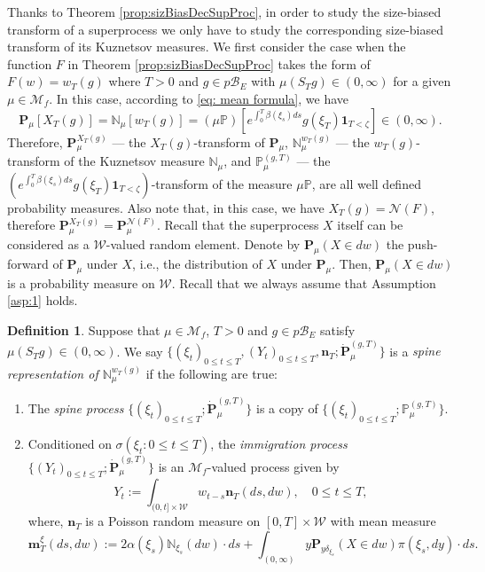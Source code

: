 \documentclass[UTF8]{pkuthss}
\theoremstyle{plain}
\theoremstyle{definition}
\newtheorem{defi}[thm]{Definition}
\numberwithin{equation}{section}
\begin{document}
	Thanks to Theorem \ref{prop:sizBiasDecSupProc}, in order to study the size-biased transform of a superprocess we only have to study the corresponding size-biased transform of its Kuznetsov measures. 	
	We first consider the case when the function $F$ in Theorem \ref{prop:sizBiasDecSupProc} takes the form of $F(w)=w_T(g)$ where $T>0$ and $g\in p\mathscr B_E$ with $\mu(S_Tg)\in (0,\infty)$ for a given $\mu \in \mathcal M_f$.
	In this case, according to \eqref{eq: mean formula}, we have
\[
	\mathbf P_\mu [X_T(g)]
	= \mathbb N_\mu[w_T(g)] 
	= (\mu\mathbb P)[e^{\int_0^T \beta(\xi_s)ds}g(\xi_T)\mathbf 1_{T < \zeta}]
	\in (0,\infty).
\]
	Therefore, $\mathbf P_\mu^{X_T(g)}$ --- the $X_T(g)$-transform of $\mathbf P_\mu$, $\mathbb N_\mu^{w_T(g)}$ --- the $w_T(g)$-transform of the Kuznetsov measure $\mathbb N_\mu$, 
	and $\mathbb P^{(g,T)}_\mu$ --- the $(e^{\int_0^T\beta(\xi_s)ds} g(\xi_T)\mathbf 1_{T< \zeta})$-transform of the measure $\mu\mathbb P$, 
	are all well defined probability measures.
	Also note that, in this case, we have $X_T(g) = \mathcal N(F)$, therefore $\mathbf P_\mu^{X_T(g)} = \mathbf P_\mu^{\mathcal N(F)}$.
Recall that the superprocess $X$ itself can be considered as a $\mathcal W$-valued random element.
	Denote by $\mathbf P_\mu(X \in dw)$ the push-forward of $\mathbf P_\mu$ under $X$, i.e., the distribution of $X$ under $\mathbf P_\mu$. Then, $\mathbf P_\mu(X \in dw)$ is a probability measure on $\mathcal W$.
	Recall that we always assume that Assumption \ref{asp:1} holds.
\begin{defi}
\label{def: Spine representation}
Suppose that $\mu \in \mathcal M_f$, $T >0$ and $g \in p\mathscr B_E$ satisfy $\mu(S_Tg)\in (0,\infty)$.
	We say $\{(\xi_t)_{0\leq t\leq T}, (Y_t)_{0\leq t\leq T}, \mathbf n_T; \dot {\mathbf P}^{(g,T)}_\mu\}$ is a \emph{spine representation of $\mathbb N_\mu^{w_T(g)}$} if the following are true:
\begin{enumerate}
\item \label{def: Spine representation 1}
	The \emph{spine process} $\{(\xi_t)_{0\leq t\leq T}; \dot{\mathbf P}^{(g,T)}_\mu\}$ is a copy of $\{(\xi_t)_{0\leq t\leq T}; \mathbb P^{(g,T)}_\mu\}$.
\item
Conditioned on $\sigma(\xi_t: 0 \leq t\leq T)$, the \emph{immigration process}
	$\{(Y_t)_{0\leq t\leq T}; \dot{\mathbf P}^{(g,T)}_\mu\}$ is an $\mathcal M_f$-valued process given by
\begin{equation}\label{eq:defSpinImmigr}
	Y_t
	:= \int_{(0,t] \times \mathcal W} w_{t-s} \mathbf n_T(ds,dw),
	\quad 0 \leq t\leq T,
\end{equation}
	where,
	$\mathbf n_T$
	is a Poisson random measure on $[0,T] \times \mathcal W$ with mean measure
\begin{equation}\label{eq:meanMeasImmigr}
	\mathbf m^\xi_T(ds,dw)
	:= 2 \alpha(\xi_s) \mathbb N_{\xi_s}(dw)\cdot ds +  \int_{(0,\infty)} y \mathbf P_{y\delta_{\xi_s}}(X\in dw) \pi(\xi_s,dy)\cdot ds.
\end{equation}
\end{enumerate}
\end{defi}
\end{document}
